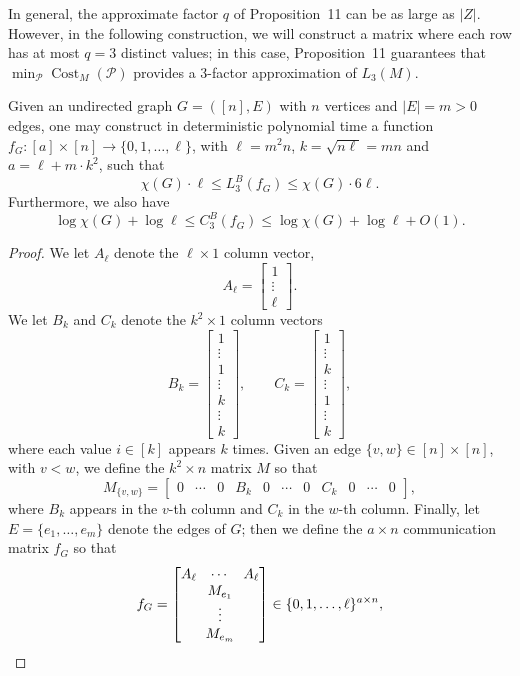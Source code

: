 In general, the approximate factor $q$ of Proposition~11 can be as large as $|Z|$. However, in the following construction, we will construct a matrix where each row has at most $q=3$ distinct values; in this case, Proposition~11 guarantees that $\min_{\mathcal P}\operatorname{Cost}_M(\mathcal P)$ provides a 3-factor approximation of $L_3(M)$.
\begin{theorem}
Given an undirected graph $G=([n],E)$ with $n$ vertices and $|E|=m>0$ edges, one may construct in deterministic polynomial time a function $f_G:[a]\times[n]\to\{0,1,\ldots,\ell\}$, with $\ell=m^2n$, $k=\sqrt{n\ell}=mn$ and $a=\ell+m\cdot k^2$, such that
\[\chi(G)\cdot\ell\le L_3^B(f_G)\le\chi(G)\cdot6\ell.\]
Furthermore, we also have
\[\log\chi(G)+\log\ell\le C_3^B(f_G)\le\log\chi(G)+\log\ell+O(1).\]
\end{theorem}
\begin{proof}
We let $A_\ell$ denote the $\ell\times1$ column vector,
\[A_\ell=\begin{bmatrix}1\\\vdots\\\ell\end{bmatrix}.\]
We let $B_k$ and $C_k$ denote the $k^2\times1$ column vectors
\[B_k=\begin{bmatrix}1\\\vdots\\1\\\vdots\\k\\\vdots\\k\end{bmatrix},\qquad C_k=\begin{bmatrix}1\\\vdots\\k\\\vdots\\1\\\vdots\\k\end{bmatrix},\]
where each value $i\in[k]$ appears $k$ times. Given an edge $\{v,w\}\in[n]\times[n]$, with $v<w$, we define the $k^2\times n$ matrix $M$ so that
\[M_{\{v,w\}}=\begin{bmatrix}0&\cdots&0&B_k&0&\cdots&0&C_k&0&\cdots&0\end{bmatrix},\]
where $B_k$ appears in the $v$-th column and $C_k$ in the $w$-th column. Finally, let $E=\{e_1,\ldots,e_m\}$ denote the edges of $G$; then we define the $a\times n$ communication matrix $f_G$ so that
\[f_G=\begin{bmatrix}A_\ell&\cdots&A_\ell\\\multicolumn{3}{c}{M_{e_1}}\\\multicolumn{3}{c}{\vdots}\\\multicolumn{3}{c}{M_{e_m}}\end{bmatrix}\in\{0,1,\ldots,\ell\}^{a\times n},\]

\end{proof}
